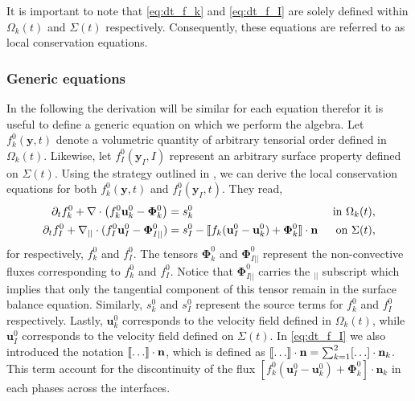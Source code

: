 It is important to note that \ref{eq:dt_f_k} and \ref{eq:dt_f_I} are solely defined within $\Omega_k(t)$ and $\Sigma(t)$ respectively.
Consequently, these equations are referred to as local conservation equations.

\subsubsection{Generic equations}

In the following the derivation will be similar for each equation therefor it is useful to define a generic equation on which we perform the algebra.
Let $f_k^0(\textbf{y},t)$ denote a volumetric quantity of arbitrary tensorial order defined in $\Omega_k(t)$.
Likewise, let $f_I^0(\textbf{y}_I,I)$ represent an arbitrary surface property defined on $\Sigma(t)$.
Using the strategy outlined in \citep{bothe2022sharp,morel2015mathematical,slattery2007interfacial}, we can derive the local conservation equations for both $f_k^0(\textbf{y},t)$ and $f_I^0(\textbf{y}_I,t)$.
They read,  
\begin{align}
    \label{eq:dt_f_k}
    \partial_t f_k^0
    +\mathbf{\nabla}\cdot \left(
        f_k^0\textbf{u}_k^0
        - \mathbf{\Phi}_k^0
        \right)
    &= 
    s_k^0
    & \text{ in } \Omega_k(t),&\\
    \partial_t f_I^0 
    +\mathbf{\nabla}_{||}\cdot
    (
        f_I^0 \textbf{u}_I^0
        - \mathbf{\Phi}_{I||}^0 
    )
    &= 
    s_I^0
    - \llbracket 
        f_k (\textbf{u}_I^0 - \textbf{u}_k^0)
        + \mathbf{\Phi}_k^0
      \rrbracket \cdot \textbf{n} 
    & \text{ on } \Sigma(t),&
    \label{eq:dt_f_I}
\end{align}
for respectively, $f_k^0$ and $f_I^0$.
The tensors $\mathbf{\Phi}_k^0$ and $\mathbf{\Phi}_{I||}^0$ represent the non-convective fluxes corresponding to $f_k^0$ and $f_I^0$. 
Notice that $\mathbf{\Phi}_{I||}^0$ carries the $_{||}$ subscript which implies that only the tangential component of this tensor remain in the surface balance equation. 
Similarly, $s_k^0$ and $s_I^0$ represent the source terms for $f_k^0$ and $f_I^0$ respectively.
Lastly, $\textbf{u}_k^0$ corresponds to the velocity field defined in $\Omega_k(t)$, while $\textbf{u}_I^0$ corresponds to the velocity field defined on $\Sigma(t)$.
In \ref{eq:dt_f_I} we also introduced the notation $\llbracket \ldots \rrbracket \cdot \textbf{n}$, which is defined as $\llbracket \ldots \rrbracket \cdot \textbf{n} = \sum_{k=1}^2 [\ldots] \cdot \textbf{n}_k$.
This term account for the discontinuity of the flux $\left[f_k^0 (\textbf{u}_I^0 - \textbf{u}_k^0)+ \mathbf{\Phi}_k^0\right]\cdot\textbf{n}_k$ in each phases across the interfaces.


